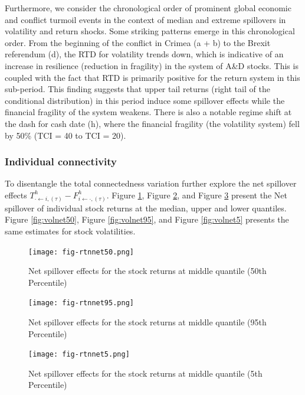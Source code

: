 \documentclass[
  letterpaper,
  DIV=11,
  numbers=noendperiod]{scrartcl}
\begin{document}
Furthermore, we consider the chronological order of prominent global
economic and conflict turmoil events in the context of median and
extreme spillovers in volatility and return shocks. Some striking
patterns emerge in this chronological order. From the beginning of the
conflict in Crimea (a + b) to the Brexit referendum (d), the RTD for
volatility trends down, which is indicative of an increase in resilience
(reduction in fragility) in the system of A\&D stocks. This is coupled
with the fact that RTD is primarily positive for the return system in
this sub-period. This finding suggests that upper tail returns (right
tail of the conditional distribution) in this period induce some
spillover effects while the financial fragility of the system weakens.
There is also a notable regime shift at the dash for cash date (h),
where the financial fragility (the volatility system) fell by 50\% (TCI
= 40 to TCI = 20).

\hypertarget{individual-connectivity}{%
\subsubsection{Individual connectivity}\label{individual-connectivity}}

To disentangle the total connectedness variation further explore the net
spillover effects
\(T_{\cdot \leftarrow i,(\tau)}^h -F_{i \leftarrow \cdot,(\tau)}^h\).
Figure \ref{fig:netrtn50}, Figure \ref{fig:netrtn95}, and Figure
\ref{fig:netrtnfive} present the Net spillover of individual stock
returns at the median, upper and lower quantiles. Figure
\ref{fig:volnet50}, Figure \ref{fig:volnet95}, and Figure
\ref{fig:volnet5} presents the same estimates for stock volatilities.

\begin{figure}
\centering
  \texttt{[image: fig-rtnnet50.png]}
  \caption{Net spillover effects for the stock returns at middle quantile (50th Percentile)}
  \label{fig:netrtn50}
\end{figure}

\begin{figure}
\centering
  \texttt{[image: fig-rtnnet95.png]}
  \caption{Net spillover effects for the stock returns at middle quantile (95th Percentile)}
  \label{fig:netrtn95}
\end{figure}

\begin{figure}
\centering
  \texttt{[image: fig-rtnnet5.png]}
  \caption{Net spillover effects for the stock returns at middle quantile (5th Percentile)}
  \label{fig:netrtnfive}
\end{figure}
\end{document}
